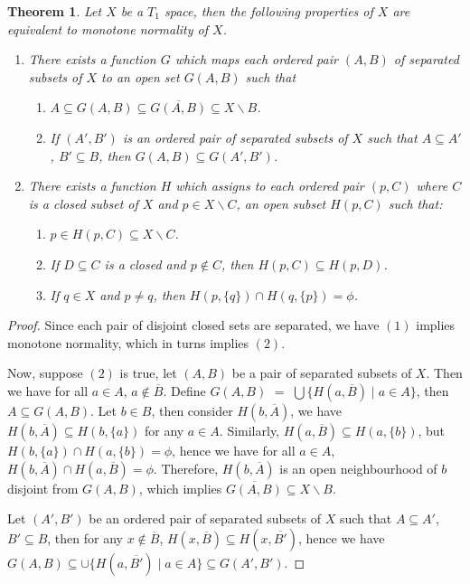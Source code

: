 \documentclass[12pt,oneside,english]{amsbook}
\numberwithin{equation}{section} %
\numberwithin{figure}{section} %
\theoremstyle{plain}
\numberwithin{section}{chapter}
\newtheorem{thm}{Theorem}[section]
\theoremstyle{plain}
\begin{document}
\begin{thm} \label{thm:mononormal:2}
  Let $X$ be a $T_1$ space, then the following properties of $X$ are equivalent to monotone normality of $X$.
  \begin{enumerate}
  \item There exists a function $G$ which maps each ordered pair $(A,B)$ of separated subsets of $X$ to an open set $G(A,B)$ such that
    \begin{enumerate}
    \item $A \subseteq G(A,B) \subseteq \overline{G(A,B)} \subseteq X \backslash B$.
    \item If $(A',B')$ is an ordered pair of separated subsets of $X$ such that $A \subseteq A'$, $B' \subseteq B$, then $G(A,B) \subseteq G(A',B')$.
    \end{enumerate}
  \item There exists a function $H$ which assigns to each ordered pair $(p,C)$ where $C$ is a closed subset of $X$ and $p \in X \backslash C$, an open subset $H(p,C)$ such that:
    \begin{enumerate}
    \item $p \in H(p,C) \subseteq X \backslash C$.
    \item If $D \subseteq C$ is a closed and $p \notin C$, then $H(p,C) \subseteq H(p,D)$.
    \item If $q \in X$ and $p \neq q$, then $H(p,\{q\}) \cap H(q,\{p\}) = \phi$.
    \end{enumerate}
  \end{enumerate}
\end{thm}
\begin{proof}
  Since each pair of disjoint closed sets are separated, we have $(1)$ implies monotone normality, which in turns implies $(2)$.

  Now, suppose $(2)$ is true, let $(A,B)$ be a pair of separated subsets of $X$. Then we have for all $a \in A$, $a \notin \overline{B}$. Define $G(A,B)$ $=$ $\bigcup \{H(a,\overline{B}) \; | \; a \in A\}$, then $A \subseteq G(A,B)$. Let $b \in B$, then consider $H(b,\overline{A})$, we have $H(b,\overline{A}) \subseteq H(b,\{a\})$ for any $a \in A$. Similarly, $H(a,\overline{B}) \subseteq H(a,\{b\})$, but $H(b,\{a\}) \cap H(a,\{b\}) = \phi$, hence we have for all $a \in A$, $H(b,\overline{A}) \cap H(a,\overline{B}) = \phi$. Therefore, $H(b,\overline{A})$ is an open neighbourhood of $b$ disjoint from $G(A,B)$, which implies $\overline{G(A,B)} \subseteq X \backslash B$.
  
  Let $(A',B')$ be an ordered pair of separated subsets of $X$ such that $A \subseteq A'$, $B' \subseteq B$, then for any $x \notin \overline{B}$, $H(x,\overline{B}) \subseteq H(x,\overline{B'})$, hence we have $G(A,B) \subseteq \cup\{H(a,\overline{B'}) \; | \; a \in A\} \subseteq G(A',B')$.
\end{proof}
\end{document}
